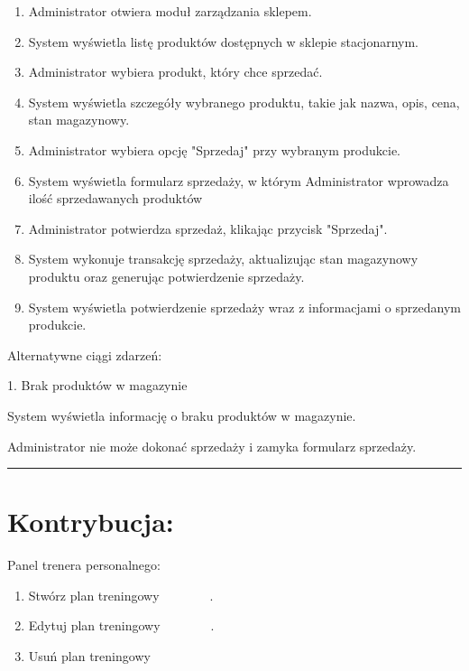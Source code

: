\documentclass[
]{article}
\providecommand{\tightlist}{%
  \setlength{\itemsep}{0pt}\setlength{\parskip}{0pt}}
\begin{document}
\begin{enumerate}
\tightlist
\item
  {Administrator otwiera moduł zarządzania sklepem.}
\item
  {System wyświetla listę produktów dostępnych w sklepie stacjonarnym.}
\item
  {Administrator wybiera produkt, który chce sprzedać.}
\item
  {System wyświetla szczegóły wybranego produktu, takie jak nazwa, opis,
  cena, stan magazynowy.}
\item
  {Administrator wybiera opcję "Sprzedaj" przy wybranym produkcie.}
\item
  {System wyświetla formularz sprzedaży, w którym Administrator
  wprowadza ilość sprzedawanych produktów}
\item
  {Administrator potwierdza sprzedaż, klikając przycisk "Sprzedaj".}
\item
  {System wykonuje transakcję sprzedaży, aktualizując stan magazynowy
  produktu oraz generując potwierdzenie sprzedaży.}
\item
  {System wyświetla potwierdzenie sprzedaży wraz z informacjami o
  sprzedanym produkcie.}
\end{enumerate}

{Alternatywne ciągi zdarzeń:}

{1. Brak produktów w magazynie}

{System wyświetla informację o braku produktów w magazynie.}

{Administrator nie może dokonać sprzedaży i zamyka formularz sprzedaży.}

\begin{center}\rule{0.5\linewidth}{0.5pt}\end{center}

{}

\hypertarget{h.3q9pme6aem79}{%
\section{\texorpdfstring{{Kontrybucja:}}{Kontrybucja:}}\label{h.3q9pme6aem79}}

{Panel trenera personalnego:}

\begin{enumerate}
\tightlist
\item
  {Stwórz plan treningowy~~~~~~~~.}
\item
  {Edytuj plan treningowy~~~~~~~~.}
\item
  {Usuń plan treningowy}
\end{enumerate}
\end{document}
